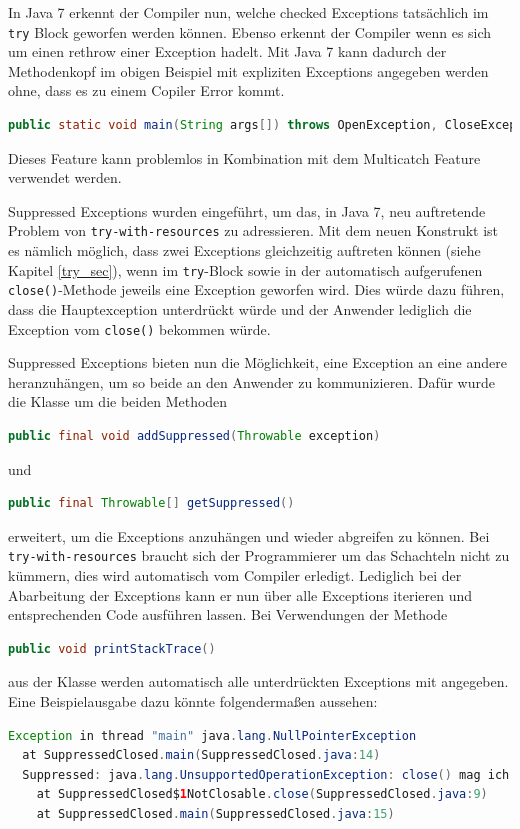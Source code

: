 \documentclass[times, 10pt,twocolumn]{article}
\begin{document}
In Java 7 erkennt der Compiler nun, welche checked Exceptions tatsächlich im \texttt{try} Block geworfen werden können. Ebenso erkennt der Compiler wenn es sich um einen rethrow einer Exception hadelt. Mit Java 7 kann dadurch der Methodenkopf im obigen Beispiel mit expliziten Exceptions angegeben werden ohne, dass es zu einem Copiler Error kommt\cite{sbJ7exeptions}.

\begin{lstlisting}[language=java,breaklines=true]
public static void main(String args[]) throws OpenException, CloseException
\end{lstlisting}

Dieses Feature kann problemlos in Kombination mit dem Multicatch Feature verwendet werden.

\label{supp_exception_subsec}
Suppressed Exceptions wurden eingeführt, um das, in Java 7, neu auftretende Problem von \texttt{try-with-resources} zu adressieren.
Mit dem neuen Konstrukt ist es nämlich möglich, dass zwei Exceptions gleichzeitig auftreten können (siehe Kapitel \ref{try_sec}), wenn im
\texttt{try}-Block sowie in der automatisch aufgerufenen \texttt{close()}-Methode jeweils eine Exception geworfen wird. Dies würde
dazu führen, dass die Hauptexception unterdrückt würde und der Anwender lediglich die Exception vom \texttt{close()} bekommen würde.

Suppressed Exceptions bieten nun die Möglichkeit, eine Exception an eine andere heranzuhängen, um so beide an den Anwender zu
kommunizieren. Dafür wurde die Klasse  um die beiden Methoden 
\begin{lstlisting}[language=java,breaklines=true]
public final void addSuppressed(Throwable exception)
\end{lstlisting}
und 
\begin{lstlisting}[language=java,breaklines=true]
public final Throwable[] getSuppressed()
\end{lstlisting}
erweitert, um die Exceptions anzuhängen und wieder abgreifen zu können. 
Bei \texttt{try-with-resources} braucht sich der Programmierer um das Schachteln nicht zu kümmern, dies wird 
automatisch vom Compiler erledigt.\cite{sbJ7coin} Lediglich bei der Abarbeitung der Exceptions kann er nun über
alle Exceptions iterieren und entsprechenden Code ausführen lassen. Bei Verwendungen der Methode
\begin{lstlisting}[language=java,breaklines=true]
public void printStackTrace()
\end{lstlisting}
aus der Klasse  werden automatisch alle unterdrückten Exceptions mit angegeben. Eine Beispielausgabe dazu könnte
folgendermaßen aussehen\cite{javainsel2}:
\begin{lstlisting}[language=java,breaklines=true]
Exception in thread "main" java.lang.NullPointerException
  at SuppressedClosed.main(SuppressedClosed.java:14)
  Suppressed: java.lang.UnsupportedOperationException: close() mag ich nicht
    at SuppressedClosed$1NotClosable.close(SuppressedClosed.java:9)
    at SuppressedClosed.main(SuppressedClosed.java:15)
\end{lstlisting}
\end{document}

